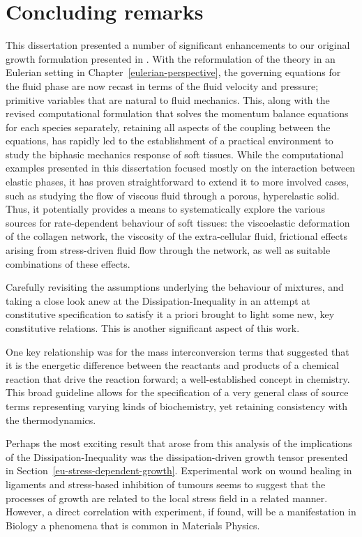 \chapter{Concluding remarks}
\label{conclusions}

This dissertation presented a number of significant enhancements to
our original growth formulation presented in \citet{growthpaper}.
With the reformulation of the theory in an Eulerian setting in
Chapter~\ref{eulerian-perspective}, the governing equations for the
fluid phase are now recast in terms of the fluid velocity and
pressure; primitive variables that are natural to fluid
mechanics. This, along with the revised computational formulation that
solves the momentum balance equations for each species separately,
retaining all aspects of the coupling between the equations, has
rapidly led to the establishment of a practical environment to study
the biphasic mechanics response of soft tissues. While the
computational examples presented in this dissertation focused mostly
on the interaction between elastic phases, it has proven
straightforward to extend it to more involved cases, such as studying
the flow of viscous fluid through a porous, hyperelastic solid. Thus,
it potentially provides a means to systematically explore the various
sources for rate-dependent behaviour of soft tissues:  the
viscoelastic deformation of the collagen network, the viscosity of the
extra-cellular fluid, frictional effects arising from stress-driven
fluid flow through the network, as well as suitable combinations of
these effects.

Carefully revisiting the assumptions underlying the behaviour of
mixtures, and taking a close look anew at the Dissipation-Inequality
in an attempt at constitutive specification to satisfy it a priori
brought to light some new, key constitutive relations. This is another
significant aspect of this work.

One key relationship was for the mass interconversion terms that
suggested that it is the energetic difference between the reactants
and products of a chemical reaction that drive the reaction forward; a
well-established concept in chemistry. This broad guideline allows for
the specification of a very general class of source terms representing
varying kinds of biochemistry, yet retaining consistency with the
thermodynamics.

Perhaps the most exciting result that arose from this analysis
of the implications of the Dissipation-Inequality was the
dissipation-driven growth tensor presented in
Section~\ref{eu-stress-dependent-growth}. Experimental work on wound
healing in ligaments \citep{Provenzanoetal:2003} and stress-based 
inhibition of tumours \citep{jain1997} seems to suggest that the
processes of growth are related to the local stress field in a
related manner. However, a direct correlation with experiment, if
found, will be a manifestation in Biology a phenomena that is common in
Materials Physics.

%

